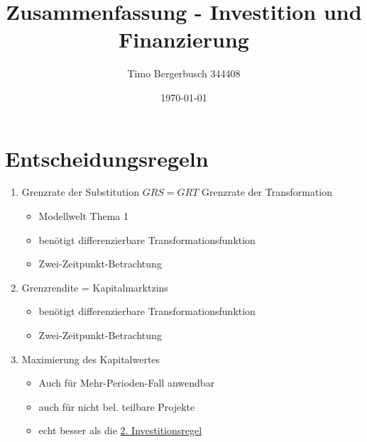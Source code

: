 \documentclass[12pt]{article}
\begin{document}
	
	\title{Zusammenfassung - Investition und Finanzierung}
	\author{Timo Bergerbusch 344408}
	\date{\specialdate\today}
	\maketitle
	\section{Entscheidungsregeln}
	\begin{enumerate}
		\item Grenzrate der Substitution $GRS=GRT$ Grenzrate der Transformation
			\begin{itemize}
				\item Modellwelt Thema 1
				\item benötigt differenzierbare Transformationsfunktion
				\item Zwei-Zeitpunkt-Betrachtung
			\end{itemize}
		\item Grenzrendite = Kapitalmarktzins\label{2Investitionsregel}
			\begin{itemize}
				\item benötigt differenzierbare Transformationsfunktion
				\item Zwei-Zeitpunkt-Betrachtung
			\end{itemize}
		\item Maximierung des Kapitalwertes 
			\begin{itemize}
				\item Auch für Mehr-Perioden-Fall anwendbar
				\item auch für nicht bel. teilbare Projekte
				\item echt besser als die \hyperref[2Investitionsregel]{2. Investitionsregel}
			\end{itemize}
	\end{enumerate}
	
	
	
	
	
\end{document}
